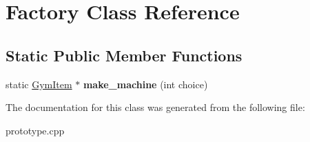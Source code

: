 \hypertarget{class_factory}{}\section{Factory Class Reference}
\label{class_factory}
\subsection*{Static Public Member Functions}
\begin{DoxyCompactItemize}
\item 
static \hyperlink{class_gym_item}{Gym\+Item} $\ast$ {\bfseries make\+\_\+machine} (int choice)\hypertarget{class_factory_aad54b69d2fbeb1a61a8519be07015cdc}{}\label{class_factory_aad54b69d2fbeb1a61a8519be07015cdc}

\end{DoxyCompactItemize}


The documentation for this class was generated from the following file\+:\begin{DoxyCompactItemize}
\item 
prototype.\+cpp\end{DoxyCompactItemize}
